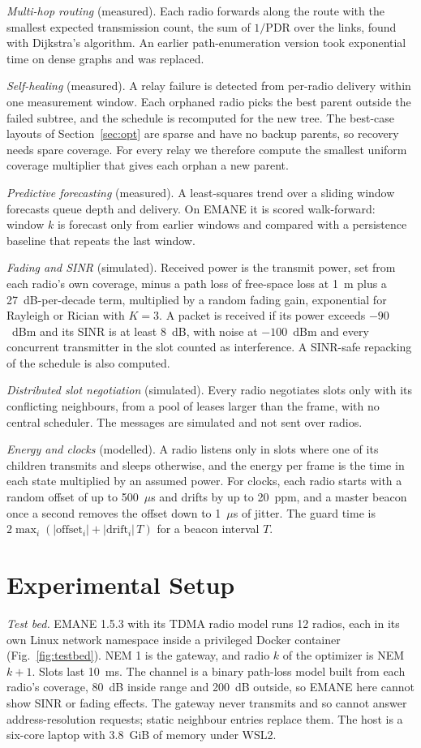 \documentclass[conference]{IEEEtran}
\begin{document}
\emph{Multi-hop routing} (measured). Each radio forwards along the route with the smallest expected transmission count, the sum of $1/\mathrm{PDR}$ over the links, found with Dijkstra's algorithm. An earlier path-enumeration version took exponential time on dense graphs and was replaced.

\emph{Self-healing} (measured). A relay failure is detected from per-radio delivery within one measurement window. Each orphaned radio picks the best parent outside the failed subtree, and the schedule is recomputed for the new tree. The best-case layouts of Section~\ref{sec:opt} are sparse and have no backup parents, so recovery needs spare coverage. For every relay we therefore compute the smallest uniform coverage multiplier that gives each orphan a new parent.

\emph{Predictive forecasting} (measured). A least-squares trend over a sliding window forecasts queue depth and delivery. On EMANE it is scored walk-forward: window $k$ is forecast only from earlier windows and compared with a persistence baseline that repeats the last window.

\emph{Fading and SINR} (simulated). Received power is the transmit power, set from each radio's own coverage, minus a path loss of free-space loss at 1~m plus a 27~dB-per-decade term, multiplied by a random fading gain, exponential for Rayleigh or Rician with $K=3$. A packet is received if its power exceeds $-90$~dBm and its SINR is at least 8~dB, with noise at $-100$~dBm and every concurrent transmitter in the slot counted as interference. A SINR-safe repacking of the schedule is also computed.

\emph{Distributed slot negotiation} (simulated). Every radio negotiates slots only with its conflicting neighbours, from a pool of leases larger than the frame, with no central scheduler. The messages are simulated and not sent over radios.

\emph{Energy and clocks} (modelled). A radio listens only in slots where one of its children transmits and sleeps otherwise, and the energy per frame is the time in each state multiplied by an assumed power. For clocks, each radio starts with a random offset of up to 500~$\mu$s and drifts by up to 20~ppm, and a master beacon once a second removes the offset down to 1~$\mu$s of jitter. The guard time is $2\max_i(|\mathrm{offset}_i|+|\mathrm{drift}_i|\,T)$ for a beacon interval $T$.

\section{Experimental Setup}\label{sec:setup}
\emph{Test bed.} EMANE 1.5.3 with its TDMA radio model runs 12 radios, each in its own Linux network namespace inside a privileged Docker container (Fig.~\ref{fig:testbed}). NEM 1 is the gateway, and radio $k$ of the optimizer is NEM $k+1$. Slots last 10~ms. The channel is a binary path-loss model built from each radio's coverage, 80~dB inside range and 200~dB outside, so EMANE here cannot show SINR or fading effects. The gateway never transmits and so cannot answer address-resolution requests; static neighbour entries replace them. The host is a six-core laptop with 3.8~GiB of memory under WSL2.
\end{document}
